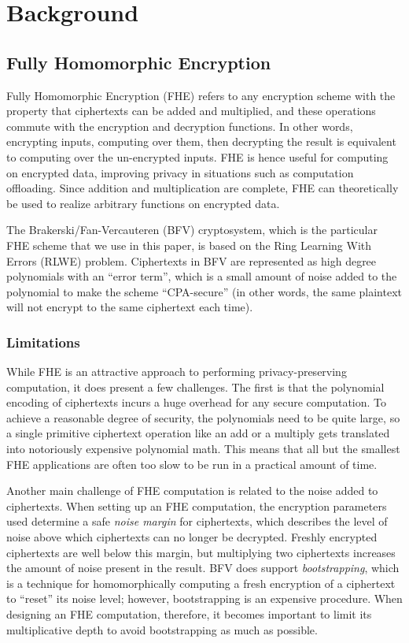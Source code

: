 \section{Background}\label{sec:background}
\subsection{Fully Homomorphic Encryption}
Fully Homomorphic Encryption (FHE) refers to any encryption scheme with the property that ciphertexts can be added and multiplied, and these operations commute with the encryption and decryption functions. In other words, encrypting inputs, computing over them, then decrypting the result is equivalent to computing over the un-encrypted inputs. FHE is hence useful for computing on encrypted data, improving privacy in situations such as computation offloading.
Since addition and multiplication are complete, FHE can theoretically be used to realize arbitrary functions on encrypted data.

The Brakerski/Fan-Vercauteren (BFV) \cite{BFV} cryptosystem, which is the particular FHE scheme that we use in this paper, is based on the Ring Learning With Errors (RLWE) problem.
Ciphertexts in BFV are represented as high degree polynomials with an ``error term'', which is a small amount of noise added to the polynomial to make the scheme ``CPA-secure'' (in other words, the same plaintext will not encrypt to the same ciphertext each time).
\subsubsection{Limitations}
While FHE is an attractive approach to performing privacy-preserving computation, it does present a few challenges.
The first is that the polynomial encoding of ciphertexts incurs a huge overhead for any secure computation.
To achieve a reasonable degree of security, the polynomials need to be quite large, so a single primitive ciphertext operation like an add or a multiply gets translated into notoriously expensive polynomial math.
This means that all but the smallest FHE applications are often too slow to be run in a practical amount of time.

Another main challenge of FHE computation is related to the noise added to ciphertexts.
When setting up an FHE computation, the encryption parameters used determine a safe {\em noise margin} for ciphertexts, which describes the level of noise above which ciphertexts can no longer be decrypted.
Freshly encrypted ciphertexts are well below this margin, but multiplying two ciphertexts increases the amount of noise present in the result.
BFV does support {\em bootstrapping}, which is a technique for homomorphically computing a fresh encryption of a ciphertext to ``reset'' its noise level; however, bootstrapping is an expensive procedure.
When designing an FHE computation, therefore, it becomes important to limit its multiplicative depth to avoid bootstrapping as much as possible.

